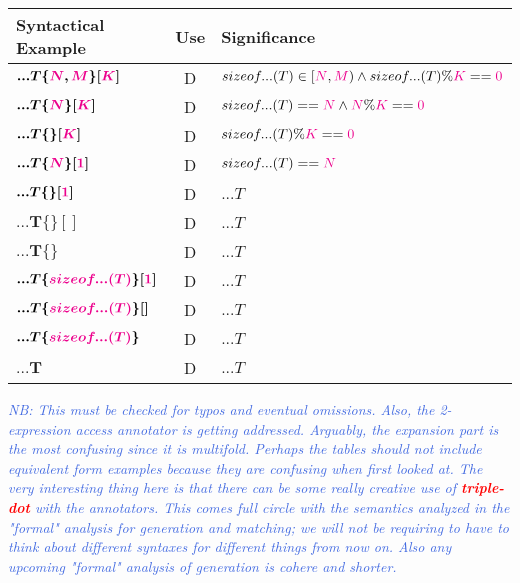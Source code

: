 \begin{tabularx}{\textwidth}{l|c|X}
  \textbf{Syntactical Example} & \textbf{Use}  &\textbf{Significance} \\
\hline
$\bm{...T\{\textcolor{Magenta}{\textcolor{Magenta}{N}},\textcolor{Magenta}{M}\}[\textcolor{Magenta}{K}]}$ & D & $sizeof...(T) \in [\textcolor{Magenta}{N},\textcolor{Magenta}{M}) \wedge{} sizeof...(T) \% \textcolor{Magenta}{K} == \textcolor{Magenta}{0}$ \\
$\bm{...T\{\textcolor{Magenta}{N}\}[\textcolor{Magenta}{K}]}$ & D & $sizeof...(T) == \textcolor{Magenta}{N} \wedge{} \textcolor{Magenta}{N} \% \textcolor{Magenta}{K} == \textcolor{Magenta}{0}$ \\
$\bm{...T\{\}[\textcolor{Magenta}{K}]}$ & D & $sizeof...(T) \% \textcolor{Magenta}{K} == \textcolor{Magenta}{0}$ \\
$\bm{...T\{\textcolor{Magenta}{N}\}[\textcolor{Magenta}{1}]}$ & D & $sizeof...(T) == \textcolor{Magenta}{N}$ \\
$\bm{...T\{\}[\textcolor{Magenta}{1}]}$ & D & $...T$ \\
$\bm{...T\{\}[]}$ & D & $...T$ \\
$\bm{...T\{\}}$ & D &$...T$ \\
$\bm{...T\{\textcolor{Magenta}{sizeof...(T)}\}[\textcolor{Magenta}{1}]}$ & D & $...T$ \\
$\bm{...T\{\textcolor{Magenta}{sizeof...(T)}\}[]}$ & D &  $...T$ \\
$\bm{...T\{\textcolor{Magenta}{sizeof...(T)}\}}$ & D & $...T$ \\
$\bm{...T}$ & D & $...T$ \\
\end{tabularx}
\newpage
\textcolor{RoyalBlue}{\textit{NB: This must be checked for typos and eventual omissions.
Also, the 2-expression access annotator is getting addressed.
Arguably, the expansion part is the most confusing since it is multifold.
Perhaps the tables should not include equivalent form examples because they are confusing when first looked at.
The very interesting thing here is that there can be some really creative use of \textcolor{Red}{\textbf{\textit{triple-dot}}} with the annotators.
This comes full circle with the semantics analyzed in the "formal" analysis for generation and matching; we will not be requiring to have to think about different syntaxes for different things from now on.
Also any upcoming "formal" analysis of generation is cohere and shorter.}}

